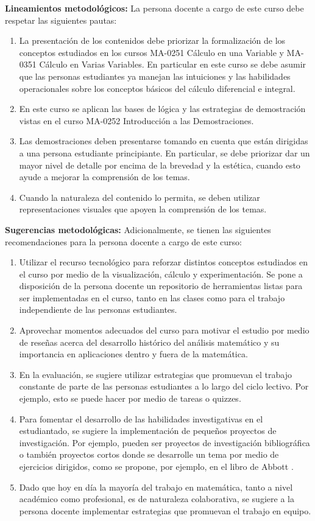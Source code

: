 \begin{refsection}
\noindent \textbf{Lineamientos metodológicos:} La persona docente a cargo de este curso debe respetar las siguientes pautas:
\begin{enumerate}
    \item La presentación de los contenidos debe priorizar la formalización de los conceptos estudiados en los cursos MA-0251 Cálculo en una Variable y MA-0351 Cálculo en Varias Variables. En particular en este curso se debe asumir que las personas estudiantes  ya manejan las intuiciones y las habilidades operacionales sobre los conceptos básicos del cálculo diferencial e integral.
    \item En este curso se aplican las bases de lógica y las estrategias de demostración vistas en el curso MA-0252 Introducción a las Demostraciones.
    \item Las demostraciones deben presentarse tomando en cuenta que están dirigidas a una persona estudiante principiante. En particular, se debe priorizar dar un mayor nivel de detalle por encima de la brevedad y la estética, cuando esto ayude a mejorar la comprensión de los temas.
    \item Cuando la naturaleza del contenido lo permita, se deben utilizar representaciones visuales que apoyen la comprensión de los temas.
\end{enumerate}

\textbf{Sugerencias metodológicas:} Adicionalmente, se tienen las siguientes recomendaciones para la persona docente a cargo de este curso:
\begin{enumerate}
    \item Utilizar el recurso tecnológico para reforzar distintos conceptos estudiados en el curso por medio de la visualización, cálculo y experimentación. Se pone a disposición de la persona docente un repositorio de herramientas listas para ser implementadas en el curso, tanto en las clases como para el trabajo independiente de las personas estudiantes.
    \item Aprovechar momentos adecuados del curso para motivar el estudio por medio de reseñas acerca del desarrollo histórico del análisis matemático y su importancia en aplicaciones dentro y fuera de la matemática.
    \item En la evaluación, se sugiere utilizar estrategias que promuevan el trabajo constante de parte de las personas estudiantes a lo largo del ciclo lectivo. Por ejemplo, esto se puede hacer por medio de tareas o quizzes.
    \item Para fomentar el desarrollo de las habilidades investigativas en el estudiantado, se sugiere la implementación de pequeños proyectos de investigación. Por ejemplo, pueden ser proyectos de investigación bibliográfica o también proyectos cortos donde se desarrolle un tema por medio de ejercicios dirigidos, como se propone, por ejemplo, en el libro de Abbott \cite{Abb15}.
    \item Dado que hoy en día la mayoría del trabajo en matemática, tanto a nivel académico como profesional, es de naturaleza colaborativa, se sugiere a la persona docente implementar estrategias que promuevan el trabajo en equipo.
\end{enumerate}





\end{refsection}
